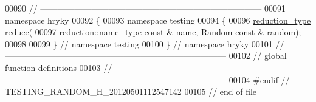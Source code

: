 \begin{DoxyCode}
00090 \textcolor{comment}{//
      ------------------------------------------------------------------------------}
00091 \textcolor{keyword}{namespace }hryky
00092 \{
00093 \textcolor{keyword}{namespace }testing
00094 \{
00096     \hyperlink{namespacehryky_a343a9a4c36a586be5c2693156200eadc}{reduction_type} \hyperlink{namespacehryky_1_1testing_ac0d0832965a175843f534a3833e525e9}{reduce}(
00097         \hyperlink{namespacehryky_1_1reduction_ac686c30a4c8d196bbd0f05629a6b921f}{reduction::name_type} \textcolor{keyword}{const} & name, Random \textcolor{keyword}{const} & random);
00098 
00099 \} \textcolor{comment}{// namespace testing}
00100 \} \textcolor{comment}{// namespace hryky}
00101 \textcolor{comment}{//
      ------------------------------------------------------------------------------}
00102 \textcolor{comment}{// global function definitions}
00103 \textcolor{comment}{//
      ------------------------------------------------------------------------------}
00104 \textcolor{preprocessor}{#endif // TESTING\_RANDOM\_H\_20120501112547142}
00105 \textcolor{preprocessor}{}\textcolor{comment}{// end of file}
\end{DoxyCode}
